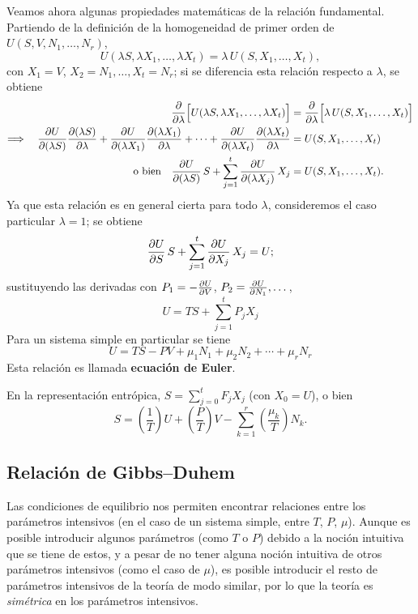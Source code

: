 Veamos ahora algunas propiedades matemáticas de la relación fundamental. Partiendo de la definición
de la homogeneidad de primer orden de $U(S,V,N_1,\dots,N_r)$,
\begin{equation*}
  U(\lambda S,\lambda X_1,\dots,\lambda X_t)=\lambda\,U(S,X_1,\dots,X_t),
\end{equation*}
con $X_1=V$, $X_2=N_1,\dots,X_t=N_r$; si se diferencia esta relación respecto a $\lambda$, se obtiene
\begin{align*}
  \pdv{\lambda}\Bigl[U(\lambda S,\lambda X_1,\dots,\lambda X_t)\Bigr]&=\pdv{\lambda}\Bigl[\lambda\,U(S,X_1,\dots,X_t)\Bigr]\\
  \Longrightarrow\quad\pdv{U}{(\lambda S)}\pdv{(\lambda S)}{\lambda}+\pdv{U}{(\lambda X_1)}\pdv{(\lambda X_1)}{\lambda}+\cdots+\pdv{U}{(\lambda X_t)}\pdv{(\lambda X_t)}{\lambda}&=U(S,X_1,\dots,X_t)\\
  \text{o bien}\quad\pdv{U}{(\lambda S)}\,S+\sum_{j=1}^{t}\pdv{U}{(\lambda X_j)}\,X_j&=U(S,X_1,\dots,X_t).
\end{align*}
Ya que esta relación es en general cierta para todo $\lambda$, consideremos el caso particular
$\lambda=1$; se obtiene
\begin{equation*}
  \pdv{U}{S}\,S+\sum_{j=1}^{t}\pdv{U}{X_j}\,X_j=U;
\end{equation*}
sustituyendo las derivadas con $P_1=-\pdv{U}{V}$, $P_2=\pdv{U}{N_1},\dots$,
\begin{equation*}
  \boxed{U=TS+\sum_{j=1}^{t}P_jX_j}
\end{equation*}
Para un sistema simple en particular se tiene
\begin{equation*}
  \boxed{U=TS-PV+\mu_1N_1+\mu_2N_2+\cdots+\mu_rN_r}
\end{equation*}
Esta relación es llamada \textbf{ecuación de Euler}.

En la representación entrópica, $S=\sum_{j=0}^{t}F_jX_j$ (con $X_0=U$), o bien
\begin{equation*}
  S=\left(\frac{1}{T}\right)U+\left(\frac{P}{T}\right)V-\sum_{k=1}^{r}\left(\frac{\mu_k}{T}\right)N_k.
\end{equation*}

\subsection*{Relación de Gibbs--Duhem}

Las condiciones de equilibrio nos permiten encontrar relaciones entre los parámetros intensivos (en
el caso de un sistema simple, entre $T$, $P$, $\mu$). Aunque es posible introducir algunos
parámetros (como $T$ o $P$) debido a la noción intuitiva que se tiene de estos, y a pesar de no
tener alguna noción intuitiva de otros parámetros intensivos (como el caso de $\mu$), es posible
introducir el resto de parámetros intensivos de la teoría de modo similar, por lo que la teoría es
\emph{simétrica} en los parámetros intensivos.

